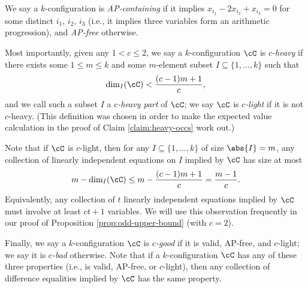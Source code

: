 We say a $k$-configuration is \emph{AP-containing} if it implies $x_{i_1} - 2x_{i_2} + x_{i_3} = 0$ for some distinct $i_1$, $i_2$, $i_3$ (i.e., it implies three variables form an arithmetic progression), and \emph{AP-free} otherwise. 

Most importantly, given any $1 < c \leq 2$, we say a $k$-configuration $\cC$ is \emph{$c$-heavy} if there exists some $1 \leq m \leq k$ and some $m$-element subset $I \subseteq \{1, \ldots, k\}$ such that \[\dim_I(\cC) < \frac{(c - 1)m + 1}{c},\] and we call such a subset $I$ a \emph{$c$-heavy part} of $\cC$; we say $\cC$ is \emph{$c$-light} if it is not $c$-heavy. (This definition was chosen in order to make the expected value calculation in the proof of Claim \ref{claim:heavy-occs} work out.)

\begin{remark}\label{rmk:c-light-alt}
    Note that if $\cC$ is $c$-light, then for any $I \subseteq \{1, \ldots, k\}$ of size $\abs{I} = m$, any collection of linearly independent equations on $I$ implied by $\cC$ has size at most \[m - \dim_I(\cC) \leq m - \frac{(c - 1)m + 1}{c} = \frac{m - 1}{c}.\] Equivalently, any collection of $t$ linearly independent equations implied by $\cC$ must involve at least $ct + 1$ variables. We will use this observation frequently in our proof of Proposition \ref{prop:odd-upper-bound} (with $c = 2$). 
\end{remark}

Finally, we say a $k$-configuration $\cC$ is \emph{$c$-good} if it is valid, AP-free, and $c$-light; we say it is \emph{$c$-bad} otherwise. Note that if a $k$-configuration $\cC$ has any of these three properties (i.e., is valid, AP-free, or $c$-light), then any collection of difference equalities implied by $\cC$ has the same property. 


